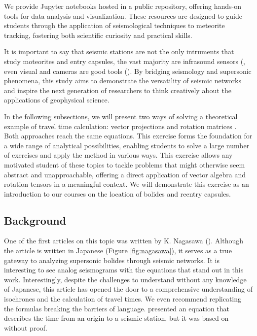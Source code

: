 \documentclass[linenum]{SSA-SRL}
\begin{document}
 We provide Jupyter notebooks \citep{7991618} hosted in a public repository, offering hands-on tools for data analysis and visualization. These resources are designed to guide students through the application of seismological techniques to meteorite tracking, fostering both scientific curiosity and practical skills.

It is important to say that seismic stations are not the only intruments that study moteorites and entry capsules, the vast majority are infrasound sensors (\citealp {Pilger_2018,Pilger_2020,Bond_r_2022,Gainville_2017,Jesus_2023,Kumar_2017,Stammler_2021}, even visual and cameras are good tools (\citealp{Arlt_2006,Borovi_KA_2003}).   By bridging seismology and supersonic phenomena, this study aims to demonstrate the versatility of seismic networks and inspire the next generation of researchers to think creatively about the applications of geophysical science.

In the following subsections, we will present two ways of solving a theoretical example of travel time calculation: vector projections \citep{Pujol_2005} and rotation matrices \citep{nagasawa_1978}. Both approaches reach the same equations. This exercise forms the foundation for a wide range of analytical possibilities, enabling students to solve a large number of exercises and apply the method in various ways. This exercise allows any motivated student of these topics to tackle problems that might otherwise seem abstract and unapproachable, offering a direct application of vector algebra and rotation tensors in a meaningful context. We will demonstrate this exercise as an introduction to our courses on the location of bolides and reentry capsules.

\subsection{\textbf{Background}}
One of the first articles on this topic was written by K. Nagasawa (\citeyear{nagasawa_1978}). Although the article is written in Japanese (Figure \ref{fig:nagasawa}), it serves as a true gateway to analyzing supersonic bolides through seismic networks. It is interesting to see analog seismograms with the equations that stand out in this work. Interestingly, despite the challenges to understand without any knowledge of Japanese, this article has opened the door to a comprehensive understanding of isochrones and the calculation of travel times. We even recommend replicating the formulas breaking the barriers of language. \cite{Ishihara_2004} presented an equation that describes the time from an origin to a seismic station, but it was based on \cite{nagasawa_1978} without proof. 
\end{document}

